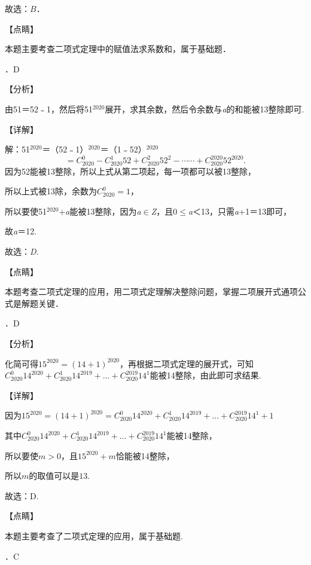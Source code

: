 \documentclass[a4paper,11pt,UTF8,twoside]{ctexart} %
\begin{document}
\noindent 故选：$B$．

\noindent 【点睛】

\noindent 本题主要考查二项式定理中的赋值法求系数和，属于基础题．

．D

\noindent 【分析】

\noindent 由51＝52﹣1，然后将51${}^{2020}$展开，求其余数，然后令余数与\textit{a}的和能被13整除即可.

\noindent 【详解】

\noindent 解：51${}^{2020}$＝（52﹣1）${}^{2020}$＝（1﹣52）${}^{2020}$
\[=C_{2020}^{0} -C_{2020}^{1} 52+C_{2020}^{2} 52^{2} -\cdots \cdots +C_{2020}^{2020} 52^{2020} .\] 
因为52能被13整除，所以上式从第二项起，每一项都可以被13整除，

\noindent 所以上式被13除，余数为$C_{2020}^{0} =1$，

\noindent 所以要使51${}^{2020}$+\textit{a}能被13整除，因为\textit{a}$\mathrm{\in}$\textit{Z}，且0$\mathrm{\le}$\textit{a}＜13，只需\textit{a}+1＝13即可，

\noindent 故\textit{a}＝12.

\noindent 故选：\textit{D.}

\noindent 【点睛】

\noindent 本题考查二项式定理的应用，用二项式定理解决整除问题，掌握二项展开式通项公式是解题关键．

．D

\noindent 【分析】

\noindent 化简可得$15^{2020} =\left(14+1\right)^{2020} $，再根据二项式定理的展开式，可知$C_{2020}^{0} 14^{2020} +C_{2020}^{1} 14^{2019} +...+C_{2020}^{2019} 14^{1} $能被14整除，由此即可求结果.

\noindent 【详解】

\noindent 因为$15^{2020} =\left(14+1\right)^{2020} =C_{2020}^{0} 14^{2020} +C_{2020}^{1} 14^{2019} +...+C_{2020}^{2019} 14^{1} +1$ 

\noindent 其中$C_{2020}^{0} 14^{2020} +C_{2020}^{1} 14^{2019} +...+C_{2020}^{2019} 14^{1} $能被14整除，

\noindent 所以要使$m>0$，且$15^{2020} +m$恰能被14整除，

\noindent 所以$m$的取值可以是$13$.

\noindent 故选：D.

\noindent 【点睛】

\noindent 本题主要考查了二项式定理的应用，属于基础题.

．C
\end{document}
